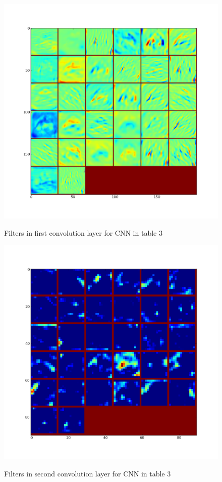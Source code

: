\documentclass[10pt,twocolumn,letterpaper]{article}
\begin{document}
\begin{figure}[hbt]

  \centering
  \includegraphics[scale=0.32]{d1}
  	\label{l1}
  \caption{Filters in first convolution layer for CNN in table 3}
\end{figure}
\begin{figure}[hbt]

  \centering
  \includegraphics[scale=0.32]{d2.png}
  \label{l2}
  \caption{Filters in second convolution layer for CNN in table 3}
\end{figure}
\end{document}
